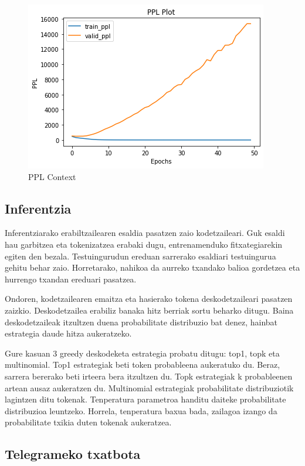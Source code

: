 \documentclass[11pt,a4paper]{article}
\begin{document}
\begin{figure}[ht]
    \centering
    \includegraphics[width=\linewidth]{ppl_context}
    \caption{PPL Context}
    \label{fig:ppl_context}
\end{figure}

\subsection{Inferentzia}
Inferentziarako erabiltzailearen esaldia pasatzen zaio kodetzaileari. Guk esaldi hau garbitzea eta tokenizatzea erabaki dugu, entrenamenduko fitxategiarekin egiten den bezala. Testuingurudun ereduan sarrerako esaldiari testuingurua gehitu behar zaio. Horretarako, nahikoa da aurreko txandako balioa gordetzea eta hurrengo txandan ereduari pasatzea.

Ondoren, kodetzailearen emaitza eta hasierako tokena deskodetzaileari pasatzen zaizkio. Deskodetzailea erabiliz banaka hitz berriak sortu beharko ditugu. Baina deskodetzaileak itzultzen duena probabilitate distribuzio bat denez, hainbat estrategia daude hitza aukeratzeko.

Gure kasuan 3 greedy deskodeketa estrategia probatu ditugu: top1, topk eta multinomial. Top1 estrategiak beti token probableena aukeratuko du. Beraz, sarrera bererako beti irteera bera itzultzen du. Topk estrategiak k probableenen artean ausaz aukeratzen du. Multinomial estrategiak probabilitate distribuziotik lagintzen ditu tokenak. Tenperatura parametroa handitu daiteke probabilitate distribuzioa leuntzeko. Horrela, tenperatura baxua bada, zailagoa izango da probabilitate txikia duten tokenak aukeratzea.

\subsection{Telegrameko txatbota}
\end{document}
